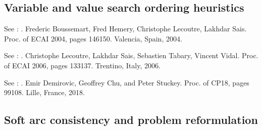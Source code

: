 \documentclass[letterpaper,10pt,openany,oneside,english]{sphinxmanual}
\begin{document}
\subsection{Variable and value search ordering heuristics}
\label{\detokenize{ref/ref_modules:variable-and-value-search-ordering-heuristics}}

\begin{fulllineitems}

\pysigstartsignatures
{}
\pysigstopsignatures
\sphinxAtStartPar
See : . Frederic Boussemart, Fred Hemery, Christophe Lecoutre, Lakhdar Sais. Proc. of ECAI 2004, pages 146\sphinxhyphen{}150. Valencia, Spain, 2004.

\sphinxAtStartPar
See : . Christophe Lecoutre, Lakhdar Sais, Sebastien Tabary, Vincent Vidal. Proc. of ECAI 2006, pages 133\sphinxhyphen{}137. Trentino, Italy, 2006.

\sphinxAtStartPar
See : . Emir Demirovic, Geoffrey Chu, and Peter Stuckey. Proc. of CP\sphinxhyphen{}18, pages 99\textendash{}108. Lille, France, 2018. 

\end{fulllineitems}



\subsection{Soft arc consistency and problem reformulation}
\label{\detokenize{ref/ref_modules:soft-arc-consistency-and-problem-reformulation}}
\end{document}
